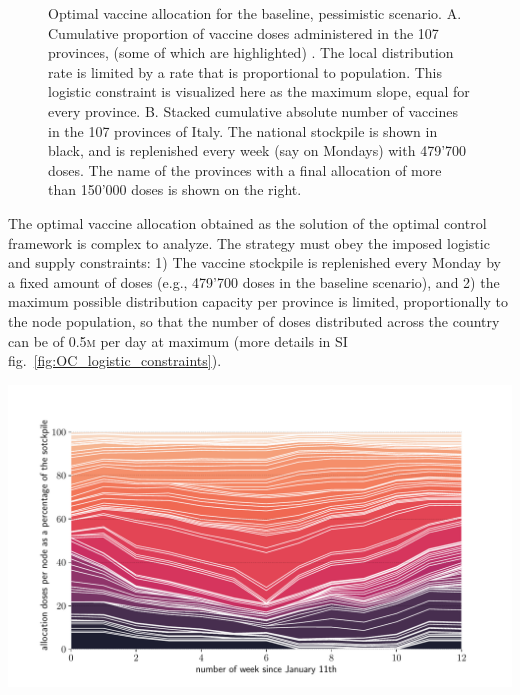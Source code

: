 \begin{figure}[!ht]
    \caption[Optimal vaccine allocation for the baseline scenario]{Optimal vaccine allocation for the baseline, pessimistic scenario. \textsc{A.} Cumulative proportion of vaccine doses administered in the 107 provinces, (some of which are highlighted) . The local distribution rate is limited by a rate that is proportional to population. This logistic constraint is visualized here as the maximum slope, equal for every province.
    \textsc{B.} Stacked cumulative absolute number of vaccines in the 107 provinces of Italy. The national stockpile is shown in black, and is replenished every week (say on Mondays) with 479'700 doses. The name of the provinces with a final allocation of more than 150'000 doses is shown on the right.}
    \label{fig:OC_stackplot}
\end{figure}

The optimal vaccine allocation obtained as the solution of the optimal control framework is complex to analyze.%
The strategy must obey the imposed logistic and supply constraints: 1) The vaccine stockpile is replenished every Monday by a fixed amount of doses (e.g., 479'700 doses in the baseline scenario), and 2) the maximum possible distribution capacity per province is limited, proportionally to the node population, so that the number of doses distributed across the country can be of 0.5\textsc{m} per day at maximum (more details in SI fig.~\ref{fig:OC_logistic_constraints}). \begin{marginfigure}[-10\baselineskip]
    \centering
    \includegraphics{fig_italy-ocp/figuresSI/SI_ts_optimal_stackplot_proportional.pdf}
    \label{fig:OC_temporal_alloaction}
\end{marginfigure}

